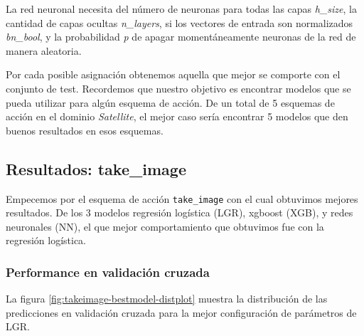 La red neuronal necesita del número de neuronas para todas las capas
\emph{h\_size}, la cantidad de capas ocultas \emph{n\_layers}, si los vectores
de entrada son normalizados \emph{bn\_bool}, y la probabilidad  \emph{p} de
apagar momentáneamente neuronas de la red de manera aleatoria.

Por cada posible asignación obtenemos aquella que mejor se comporte con el
conjunto de test. Recordemos que nuestro objetivo es encontrar modelos que se
pueda utilizar para algún esquema de acción. De un total de 5 esquemas de acción
en el dominio \emph{Satellite}, el mejor caso sería encontrar 5 modelos que den
buenos resultados en esos esquemas.

\subsection{Resultados: take\_image}

Empecemos por el esquema de acción \verb|take_image| con el cual obtuvimos
mejores resultados. De los 3 modelos regresión logística (LGR), xgboost (XGB), y
redes neuronales (NN), el que mejor comportamiento que obtuvimos fue con la
regresión logística. 

\subsubsection{Performance en validación cruzada}

La figura \ref{fig:takeimage-bestmodel-distplot} muestra la distribución de las
predicciones en validación cruzada para la mejor configuración de parámetros de
LGR.


